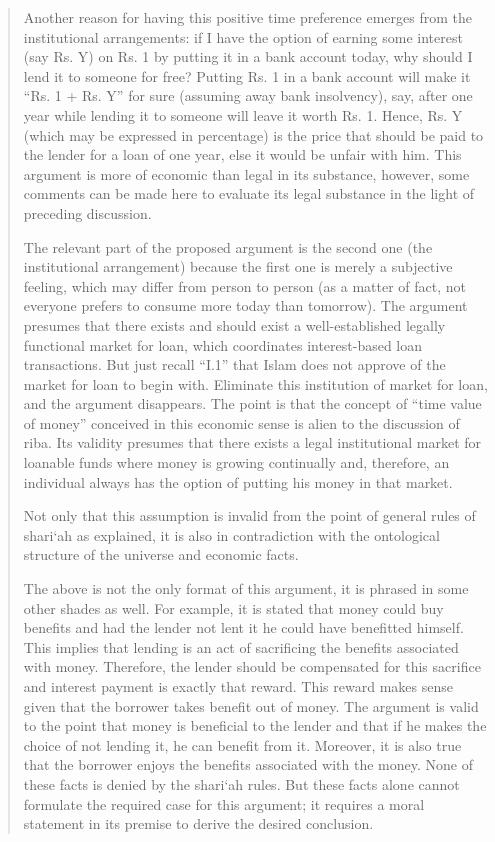 \begin{quote}
Another reason for having this positive time preference emerges from the institutional arrangements: if I have the option of earning some interest (say Rs. Y) on Rs. 1 by putting it in a bank account today, why should I lend it to someone for free? Putting Rs. 1 in a bank account will make it “Rs. 1 + Rs. Y” for sure (assuming away bank insolvency), say, after one year while lending it to someone will leave it worth Rs. 1. Hence, Rs. Y (which may be expressed in percentage) is the price that should be paid to the lender for a loan of one year, else it would be unfair with him. This argument is more of economic than legal in its substance, however, some comments can be made here to evaluate its legal substance in the light of preceding discussion.

The relevant part of the proposed argument is the second one (the institutional arrangement) because the first one is merely a subjective feeling, which may differ from person to person (as a matter of fact, not everyone prefers to consume more today than tomorrow). The argument presumes that there exists and should exist a well-established legally functional market for loan, which coordinates interest-based loan transactions. But just recall “I.1” that Islam does not approve of the market for loan to begin with. Eliminate this institution of market for loan, and the argument disappears. The point is that the concept of “time value of money” conceived in this economic sense is alien to the discussion of riba. Its validity presumes that there exists a legal institutional market for loanable funds where money is growing continually and, therefore, an individual always has the option of putting his money in that market.

Not only that this assumption is invalid from the point of general rules of shari‘ah as explained, it is also in contradiction with the ontological structure of the universe and economic facts.

The above is not the only format of this argument, it is phrased in some other shades as well. For example, it is stated that money could buy benefits and had the lender not lent it he could have benefitted himself. This implies that lending is an act of sacrificing the benefits associated with money. Therefore, the lender should be compensated for this sacrifice and interest payment is exactly that reward. This reward makes sense given that the borrower takes benefit out of money. The argument is valid to the point that money is beneficial to the lender and that if he makes the choice of not lending it, he can benefit from it. Moreover, it is also true that the borrower enjoys the benefits associated with the money. None of these facts is denied by the shari‘ah rules. But these facts alone cannot formulate the required case for this argument; it requires a moral statement in its premise to derive the desired conclusion.


\end{quote}
